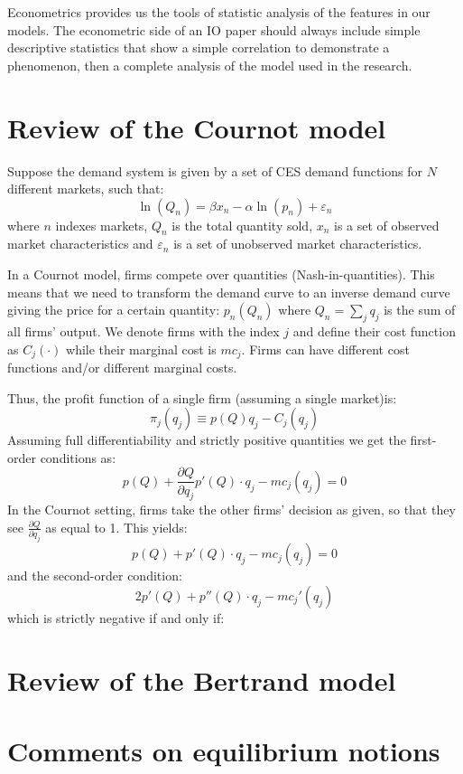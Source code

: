 \documentclass[12pt]{report}
\begin{document}
Econometrics provides us the tools of statistic analysis of the features in our models. The econometric side of an IO paper should always include simple descriptive statistics that show a simple correlation to demonstrate a phenomenon, then a complete analysis of the model used in the research.

\section{Review of the Cournot model}

Suppose the demand system is given by a set of CES demand functions for $N$ different markets, such that: $$\ln(Q_n) = \beta x_n - \alpha \ln(p_n) + \varepsilon_n $$ where $n$ indexes markets, $Q_n$ is the total quantity sold, $x_n$ is a set of observed market characteristics and $\varepsilon_n$ is a set of unobserved market characteristics.

In a Cournot model, firms compete over quantities (Nash-in-quantities). This means that we need to transform the demand curve to an inverse demand curve giving the price for a certain quantity: $p_n(Q_n)$ where $Q_n = \sum_{j} q_j$ is the sum of all firms' output. We denote firms with the index $j$ and define their cost function as $C_j(\cdot)$ while their marginal cost is $mc_j$. Firms can have different cost functions and/or different marginal costs.

Thus, the profit function of a single firm (assuming a single market)is: $$\pi_j(q_j) \equiv p(Q)q_j - C_j(q_j)$$ Assuming full differentiability and strictly positive quantities we get the first-order conditions as: $$ p(Q) + \frac{\partial Q}{\partial q_j}p'(Q)\cdot q_j - mc_j(q_j) = 0 $$ In the Cournot setting, firms take the other firms' decision as given, so that they see $\frac{\partial Q}{\partial q_j}$ as equal to 1. This yields:$$p(Q) + p'(Q)\cdot q_j - mc_j(q_j) = 0 $$ and the second-order condition: $$2 p'(Q) + p''(Q)\cdot q_j - mc_j'(q_j) $$ which is strictly negative if and only if: 

\section{Review of the Bertrand model}



\section{Comments on equilibrium notions}
\end{document}
